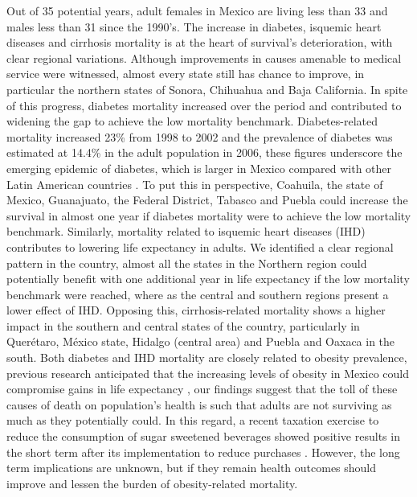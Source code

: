 \documentclass[11.5pt]{article}
\begin{document}
\begin{spacing}{1.5}
Out of 35 potential years, adult females in Mexico are living less than 33 and males less than 31 since the 1990's. The increase in  diabetes, isquemic heart diseases and cirrhosis mortality is at the heart of survival's deterioration, with clear regional variations. Although improvements in causes amenable to medical service were witnessed, almost every state still has chance to improve, in particular the northern states of Sonora, Chihuahua and Baja California. In spite of this progress, diabetes mortality increased over the period and contributed to widening the gap to achieve the low mortality benchmark. Diabetes-related mortality increased 23\% from 1998 to 2002 and the prevalence of diabetes was estimated at 14.4\% in the adult population in 2006, these figures underscore the emerging epidemic of diabetes, which is larger in Mexico compared with other Latin American countries \citep{glassman2010confronting}. To put this in perspective, Coahuila, the state of Mexico, Guanajuato, the Federal District, Tabasco and Puebla could increase the survival in almost one year if diabetes mortality were to achieve the low mortality benchmark. Similarly, mortality related to isquemic heart diseases (IHD) contributes to lowering life expectancy in adults. We identified a clear regional pattern in the country, almost all the states in the Northern region could potentially benefit with one additional year in life expectancy if the low mortality benchmark were reached, where as the central and southern regions present a lower effect of IHD. Opposing this, cirrhosis-related mortality shows a higher impact in the southern and central states of the country, particularly in Quer\'etaro, M\'exico state, Hidalgo (central area) and Puebla and Oaxaca in the south. Both diabetes and IHD mortality are closely related to obesity prevalence, previous research anticipated that the increasing levels of obesity in Mexico could compromise gains in life expectancy \citep{monteverde2010obesity}, our findings suggest that the toll of these causes of death on population's health is such that adults are not surviving as much as they potentially could. In this regard, a recent taxation exercise to reduce the consumption of sugar sweetened beverages showed positive results in the short term after its implementation to reduce purchases \citep{colchero2016beverage}. However, the long term implications are unknown, but if they remain health outcomes should improve and lessen the burden of obesity-related mortality.


\end{spacing}
\end{document}
